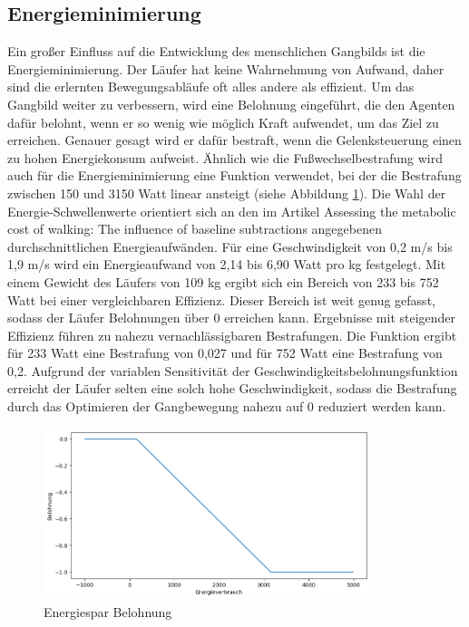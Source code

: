 \subsection{Energieminimierung}
Ein großer Einfluss auf die Entwicklung des menschlichen Gangbilds ist die Energieminimierung. Der Läufer hat keine Wahrnehmung von Aufwand, daher sind die erlernten Bewegungsabläufe oft alles andere als effizient. Um das Gangbild weiter zu verbessern, wird eine Belohnung eingeführt, die den Agenten dafür belohnt, wenn er so wenig wie möglich Kraft aufwendet, um das Ziel zu erreichen. Genauer gesagt wird er dafür bestraft, wenn die Gelenksteuerung einen zu hohen Energiekonsum aufweist. Ähnlich wie die Fußwechselbestrafung wird auch für die Energieminimierung eine Funktion verwendet, bei der die Bestrafung zwischen 150 und 3150 Watt linear ansteigt (siehe Abbildung \ref{fig:plot_energiespar}). Die Wahl der Energie-Schwellenwerte orientiert sich an den im Artikel \grqq{}Assessing the metabolic cost of walking: The influence of baseline subtractions\grqq{} angegebenen durchschnittlichen Energieaufwänden.\cite{5333126}  Für eine Geschwindigkeit von 0,2 m/s bis 1,9 m/s wird ein Energieaufwand von 2,14 bis 6,90 Watt pro kg festgelegt. Mit einem Gewicht des Läufers von 109 kg ergibt sich ein Bereich von 233 bis 752 Watt bei einer vergleichbaren Effizienz. Dieser Bereich ist weit genug gefasst, sodass der Läufer Belohnungen über 0 erreichen kann. Ergebnisse mit steigender Effizienz führen zu nahezu vernachlässigbaren Bestrafungen. Die Funktion ergibt für 233 Watt eine Bestrafung von 0,027 und für 752 Watt eine Bestrafung von 0,2. Aufgrund der variablen Sensitivität der Geschwindigkeitsbelohnungsfunktion erreicht der Läufer selten eine solch hohe Geschwindigkeit, sodass die Bestrafung durch das Optimieren der Gangbewegung nahezu auf 0 reduziert werden kann.

\begin{figure}[H]
  \centering
  \includegraphics[width=0.85\textwidth]{img/plot_energiespar} 
  \caption{Energiespar Belohnung}
  \label{fig:plot_energiespar}
\end{figure}

